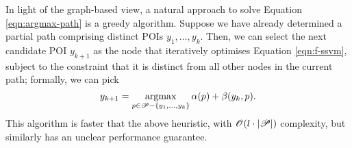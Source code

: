 
In light of the graph-based view, a natural approach to solve Equation \ref{eqn:argmax-path} is a greedy algorithm.
Suppose we have already determined a partial path comprising distinct POIs $y_1, \ldots, y_k$.
Then, we can select the next candidate POI $y_{k + 1}$ as
the node
that iteratively optimises Equation \ref{eqn:f-ssvm},
subject to the constraint that it is distinct from all other nodes in the current path;
formally, we can pick
$$ y_{k + 1} = \operatorname*{argmax}_{p \in \mathscr{P} - \{ y_1, \ldots, y_k \}} \alpha( p ) + \beta( y_k, p ). $$
This algorithm is faster that the above heuristic, with $\mathscr{O}(l \cdot | \mathscr{P} |)$ complexity,
but similarly has an unclear performance guarantee.

